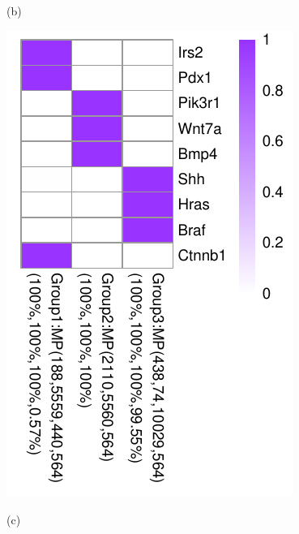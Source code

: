 \documentclass{bmcart}
\begin{document}
\begin{figure}[!h]
\begin{minipage}{.20\linewidth}
    \centerline{(b)}
  \end{minipage}
  \begin{minipage}{.20\linewidth}
   \includegraphics[width=\linewidth]{DrawPictures/v3.pdf}
    \centerline{(c)}
  \end{minipage}
  \begin{minipage}{.20\linewidth}

\end{minipage}
\end{figure}
\end{document}
